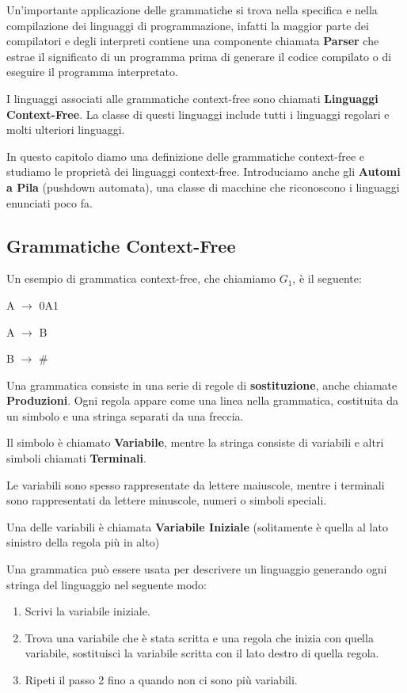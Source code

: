 \documentclass{article}
\begin{document}
Un'importante applicazione delle grammatiche si trova nella specifica e nella compilazione dei linguaggi di programmazione, infatti la maggior parte dei compilatori e degli interpreti contiene una componente chiamata \textbf{Parser} che estrae il significato di un programma prima di generare il codice compilato o di eseguire il programma interpretato.

I linguaggi associati alle grammatiche context-free sono chiamati \textbf{Linguaggi Context-Free}. La classe di questi linguaggi include tutti i linguaggi regolari e molti ulteriori linguaggi.

In questo capitolo diamo una definizione delle grammatiche context-free e studiamo le proprietà dei linguaggi context-free. Introduciamo anche gli \textbf{Automi a Pila} (pushdown automata), una classe di macchine che riconoscono i linguaggi enunciati poco fa.

\subsection{Grammatiche Context-Free}

Un esempio di grammatica context-free, che chiamiamo $G_1$, è il seguente:

\begin{center}
    A $\rightarrow$ 0A1

    A $\rightarrow$ B

    B $\rightarrow$ \#
    
\end{center}

Una grammatica consiste in una serie di regole di \textbf{sostituzione}, anche chiamate \textbf{Produzioni}. Ogni regola appare come una linea nella grammatica, costituita da un simbolo e una stringa separati da una freccia.

Il simbolo è chiamato \textbf{Variabile}, mentre la stringa consiste di variabili e altri simboli chiamati \textbf{Terminali}.

Le variabili sono spesso rappresentate da lettere maiuscole, mentre i terminali sono rappresentati da lettere minuscole, numeri o simboli speciali.

Una delle variabili è chiamata \textbf{Variabile Iniziale} (solitamente è quella al lato sinistro della regola più in alto)

Una grammatica può essere usata per descrivere un linguaggio generando ogni stringa del linguaggio nel seguente modo:

\begin{enumerate}
    \item Scrivi la variabile iniziale.
    \item Trova una variabile che è stata scritta e una regola che inizia con quella variabile, sostituisci la variabile scritta con il lato destro di quella regola.
    \item Ripeti il passo 2 fino a quando non ci sono più variabili.
\end{enumerate}
\end{document}
